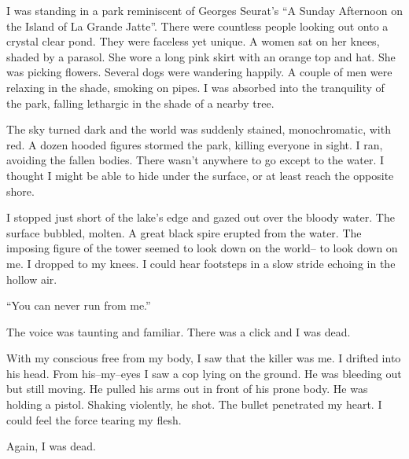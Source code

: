 \noindent
I was standing in a park reminiscent of
Georges Seurat's ``A Sunday Afternoon on the Island of La Grande Jatte''.
There were countless people looking out onto a crystal clear pond.
They were faceless yet unique.
A women sat on her knees, shaded by a parasol.
She wore a long pink skirt with an orange top and hat.
She was picking flowers.
Several dogs were wandering happily.
A couple of men were relaxing in the shade, smoking on pipes.
I was absorbed into the tranquility of the park,
falling lethargic in the shade of a nearby tree.


The sky turned dark and the world was suddenly stained, monochromatic, with red.
A dozen hooded figures stormed the park, killing everyone in sight.
I ran, avoiding the fallen bodies.
There wasn't anywhere to go except to the water.
I thought I might be able to hide under the surface, or at least reach
the opposite shore.


I stopped just short of the lake's edge and gazed out over the bloody water.
The surface bubbled, molten.
A great black spire erupted from the water.
The imposing figure of the tower seemed to look down on the world--
to look down on me.
I dropped to my knees.
I could hear footsteps in a slow stride echoing in the hollow air.
\VV


``You can never run from me.''
\VV


\noindent
The voice was taunting and familiar.
There was a click and I was dead.
\VV


\noindent
With my conscious free from my body, I saw that the killer was me.
I drifted into his head.  From his--my--eyes I saw a cop lying on the ground.
He was bleeding out but still moving.  He pulled his arms out in front of his
prone body.  He was holding a pistol.  Shaking violently, he shot.
The bullet penetrated my heart.  I could feel the force tearing my flesh.
\VV


\noindent
Again, I was dead.

